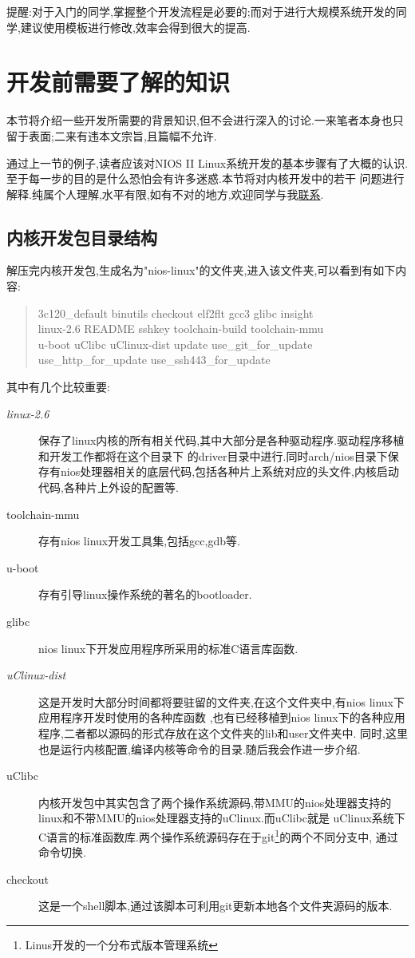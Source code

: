 \documentclass[12pt,a4paper,titlepage]{article}
\begin{document}
提醒:对于入门的同学,掌握整个开发流程是必要的;而对于进行大规模系统开发的同学,建议使用模板进行修改,效率会得到很大的提高.
\newpage{}
\section{开发前需要了解的知识}
\setcounter{footnote}{0}
本节将介绍一些开发所需要的背景知识,但不会进行深入的讨论.一来笔者本身也只留于表面;二来有违本文宗旨,且篇幅不允许.

通过上一节的例子,读者应该对NIOS II Linux系统开发的基本步骤有了大概的认识.至于每一步的目的是什么恐怕会有许多迷惑.本节将对内核开发中的若干
问题进行解释.纯属个人理解,水平有限,如有不对的地方,欢迎同学与我\href{mailto:cfistalent@gmail.com}{联系}.
\subsection{内核开发包目录结构}
解压完内核开发包,生成名为"nios-linux"的文件夹,进入该文件夹,可以看到有如下内容:
\begin{quote}
3c120\_default binutils checkout elf2flt gcc3 glibc insight\\
linux-2.6 README sshkey toolchain-build toolchain-mmu\\
u-boot uClibc uClinux-dist update use\_git\_for\_update\\
use\_http\_for\_update use\_ssh443\_for\_update
\end{quote}
其中有几个比较重要:
\begin{description}
\item[\textit{linux-2.6}] 保存了linux内核的所有相关代码,其中大部分是各种驱动程序.驱动程序移植和开发工作都将在这个目录下
的driver目录中进行.同时arch/nios目录下保存有nios处理器相关的底层代码,包括各种片上系统对应的头文件,内核启动代码,各种片上外设的配置等.
\item[toolchain-mmu] 存有nios linux开发工具集,包括gcc,gdb等.
\item[u-boot] 存有引导linux操作系统的著名的bootloader.
\item[glibc] nios linux下开发应用程序所采用的标准C语言库函数.
\item[\textit{uClinux-dist}] 这是开发时大部分时间都将要驻留的文件夹,在这个文件夹中,有nios linux下应用程序开发时使用的各种库函数
,也有已经移植到nios linux下的各种应用程序,二者都以源码的形式存放在这个文件夹的lib和user文件夹中.
同时,这里也是运行内核配置,编译内核等命令的目录.随后我会作进一步介绍.
\item[uClibc] 内核开发包中其实包含了两个操作系统源码,带MMU的nios处理器支持的linux和不带MMU的nios处理器支持的uClinux.而uClibc就是
uClinux系统下C语言的标准函数库.两个操作系统源码存在于git\footnote{Linus开发的一个分布式版本管理系统}的两个不同分支中,
通过命令切换.
\item[checkout] 这是一个shell脚本,通过该脚本可利用git更新本地各个文件夹源码的版本.
\end{description}
\end{document}
